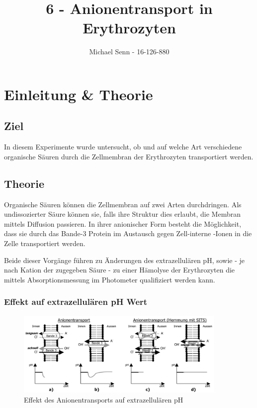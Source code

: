 \documentclass[a4paper,german]{scrreprt}
\title{6 - Anionentransport in Erythrozyten}
\author{Michael Senn \maillink{michael.senn@students.unibe.ch} - 16-126-880}
\date{\printdate}
\begin{document}
\maketitle

\chapter{Einleitung \& Theorie}

\section{Ziel}

In diesem Experimente wurde untersucht, ob und auf welche Art verschiedene
organische Säuren durch die Zellmembran der Erythrozyten transportiert werden.

\section{Theorie}

Organische Säuren können die Zellmembran auf zwei Arten durchdringen. Als
undissozierter Säure können sie, falls ihre Struktur dies erlaubt, die Membran
mittels Diffusion passieren. In ihrer anionischer Form besteht die Möglichkeit,
dass sie durch das Bande-3 Protein im Austausch gegen Zell-interne
-Ionen in die Zelle transportiert werden.

Beide dieser Vorgänge führen zu Änderungen des extrazellulären pH, sowie - je
nach Kation der zugegeben Säure - zu einer Hämolyse der Erythrozyten die
mittels Absorptionsmessung im Photometer qualifiziert werden kann.

\subsection{Effekt auf extrazellulären pH Wert}

\begin{figure}[h]
	\centering
	\includegraphics[width=0.9\textwidth]{img/th_transport_ph_ani}
	\caption{Effekt des Anionentransports auf extrazellulären pH}
	\label{fig:transport_ph_ani}
\end{figure}
\end{document}
